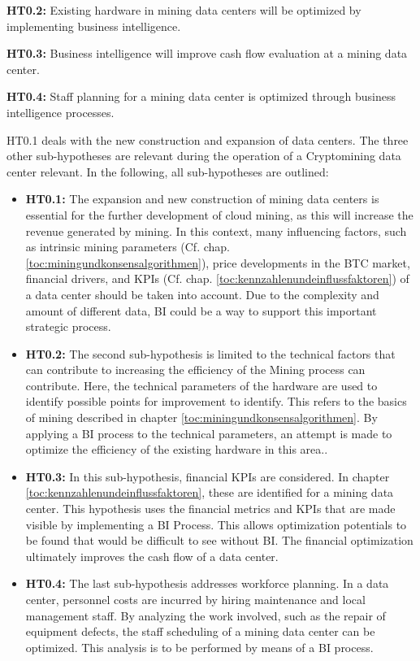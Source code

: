 \textbf{\ac{HT0.2}: }Existing hardware in mining data centers will be optimized by implementing business intelligence. 

\textbf{\ac{HT0.3}: }Business intelligence will improve cash flow evaluation at a mining data center. 

\textbf{\ac{HT0.4}: }Staff planning for a mining data center is optimized through business intelligence processes. 

\ac{HT0.1} deals with the new construction and expansion of data centers. The three other sub-hypotheses are relevant during the operation of a
Cryptomining data center relevant. In the following, all sub-hypotheses are outlined: 

\begin{itemize} 
    \item \textbf{\ac{HT0.1}: }The expansion and new construction of mining data centers is essential for the further development of cloud mining,
    as this will increase the revenue generated by mining. In this context, many influencing factors, such as intrinsic mining
    parameters (Cf. chap. \ref{toc:miningundkonsensalgorithmen}), price developments in the \ac{BTC} market, financial drivers, and \acp{KPI}
    (Cf. chap. \ref{toc:kennzahlenundeinflussfaktoren}) of a data center should be taken into account. Due to the complexity and amount of
    different data, \ac{BI} could be a way to support this important strategic process. 
    \item \textbf{\ac{HT0.2}: }The second sub-hypothesis is limited to the technical factors that can contribute to increasing the efficiency of the
    Mining process can contribute. Here, the technical parameters of the hardware are used to identify possible points for improvement
    to identify. This refers to the basics of mining described in chapter \ref{toc:miningundkonsensalgorithmen}.
    By applying a \ac{BI} process to the technical parameters, an attempt is made to optimize the efficiency of the existing hardware in this area..
    \item \textbf{\ac{HT0.3}: }In this sub-hypothesis, financial \acp{KPI} are considered. In chapter
    \ref{toc:kennzahlenundeinflussfaktoren}, these are identified for a mining data center. This hypothesis uses the financial
    metrics and \acp{KPI} that are made visible by implementing a \ac{BI} Process. This allows optimization potentials to be
    found that would be difficult to see without \ac{BI}. The financial optimization ultimately improves the cash flow of a
    data center. 
    \item \textbf{\ac{HT0.4}: }The last sub-hypothesis addresses workforce planning. In a data center, personnel costs are incurred by
    hiring maintenance and local management staff. By analyzing the work involved, such as the
    repair of equipment defects, the staff scheduling of a mining data center can be optimized. This analysis is to be performed by means of a
    \ac{BI} process.
\end{itemize}


